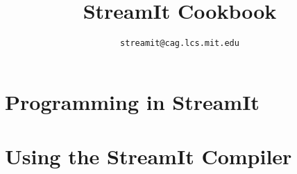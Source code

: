\documentclass[11pt]{article}
\title{StreamIt Cookbook}
\author{\texttt{streamit@cag.lcs.mit.edu}}
\begin{document}
\maketitle



\section{Programming in StreamIt}








\bigskip \section{Using the StreamIt Compiler}
\label{sec:compiler}


\appendix



\end{document}
